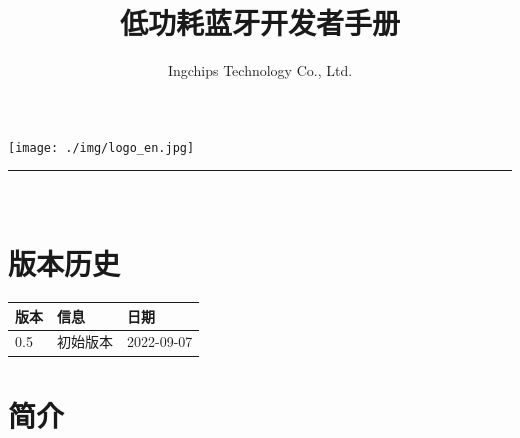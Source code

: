 \documentclass[
  12pt,
]{book}
\title{低功耗蓝牙开发者手册}
\author{Ingchips Technology Co., Ltd.}
\date{}
\let\oldmaketitle\maketitle
\begin{document}
\maketitle

\thispagestyle{empty}
\begin{center}
\end{center}

\setlength{\abovedisplayskip}{-5pt}
\setlength{\abovedisplayshortskip}{-5pt}

\thispagestyle{empty}

\makeatletter
\begin{center}
    \vspace{5ex}
    \texttt{[image: ./img/logo\_en.jpg]}\\[15ex]
    {\huge  \@title }
    \noindent\rule{10cm}{0.4pt}\\[68ex]
    {\large \@author}
\end{center}
\makeatother


\newpage
\thispagestyle{empty}


{
\setcounter{tocdepth}{2}
\tableofcontents
}
\listoftables
\listoffigures
\hypertarget{revision-history}{%
\chapter{版本历史}\label{revision-history}}

\begin{longtable}[]{@{}lll@{}}
\toprule
版本 & 信息 & 日期\tabularnewline
\midrule
\endhead
0.5 & 初始版本 & 2022-09-07\tabularnewline
\bottomrule
\end{longtable}

\mainmatter

\hypertarget{ch-intro}{%
\chapter{简介}\label{ch-intro}}
\end{document}
